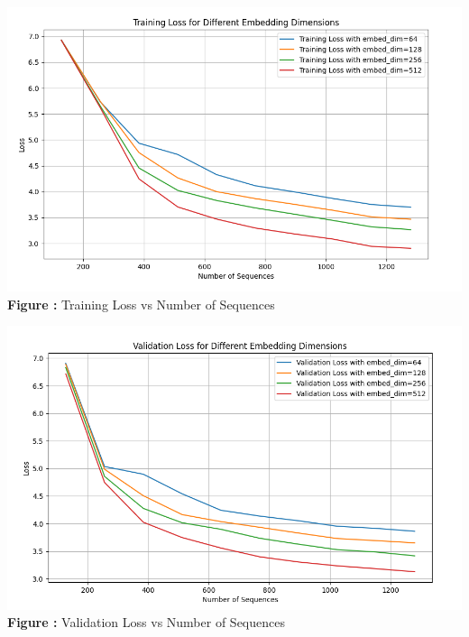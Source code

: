 \documentclass[11pt,addpoints,answers]{exam}
\begin{document}
\begin{questions}
\begin{parts}
\begin{your_solution}[height=7cm]
	\begin{minipage}{0.48\linewidth}
	\centering
	\includegraphics[width=\linewidth]{../handout/Q5_1_training.png}
	 \\ %
	{\tiny \textbf{Figure \thefigure:} Training Loss vs Number of Sequences}  %
	\label{fig:Q5_1_training}         %
	\end{minipage}
	\hfill
	\begin{minipage}{0.48\linewidth}
	\centering
	\includegraphics[width=\linewidth]{../handout/Q5_1_validation.png}
	 \\ %
	{\tiny \textbf{Figure \thefigure:} Validation Loss vs Number of Sequences} %
	\label{fig:Q5_1_validation}         %
	\end{minipage}    
\end{your_solution}


\end{parts}
\end{questions}
\end{document}

